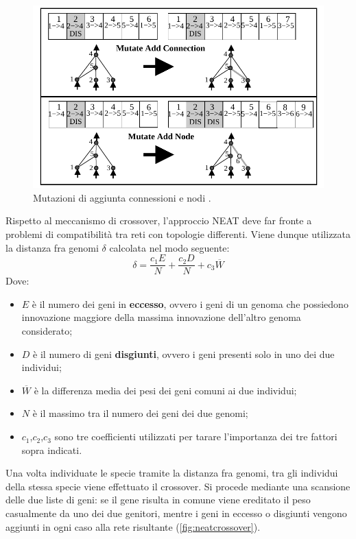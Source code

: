 \begin{figure}[H]
	\includegraphics[width=\textwidth]{img/neat-mutation.png}
	\caption{Mutazioni di aggiunta connessioni e nodi
	\cite{stanley2002evolving}.}
	\label{fig:nodemutate}
\end{figure}

Rispetto al meccanismo di crossover, l'approccio NEAT deve far fronte a problemi
di compatibilità tra reti con topologie differenti. Viene dunque utilizzata la
distanza fra genomi $\delta$ calcolata nel modo seguente:
\[\delta = \frac{c_1 E}{N} + \frac{c_2 D}{N} + c_3 \overline{W}\]
Dove:
\begin{itemize}
	\item $E$ è il numero dei geni in \textbf{eccesso}, ovvero i geni
	di un genoma che possiedono innovazione maggiore della massima
	innovazione dell'altro genoma considerato;
	\item $D$ è il numero di geni \textbf{disgiunti}, ovvero i geni presenti
	solo in uno dei due individui;
	\item $\overline{W}$ è la differenza media dei pesi dei geni comuni ai
	due individui;
	\item $N$ è il massimo tra il numero dei geni dei due genomi;

	\item $c_1$,$c_2$,$c_3$ sono tre coefficienti utilizzati per tarare
	l'importanza dei tre fattori sopra indicati.
\end{itemize}

Una volta individuate le specie tramite la distanza fra genomi, tra gli
individui della stessa specie viene effettuato il crossover. Si procede mediante
una scansione delle due liste di geni: se il gene risulta in comune viene
ereditato il peso casualmente da uno dei due genitori, mentre i geni in eccesso
o disgiunti vengono aggiunti in ogni caso alla rete risultante
(\cref{fig:neatcrossover}).

